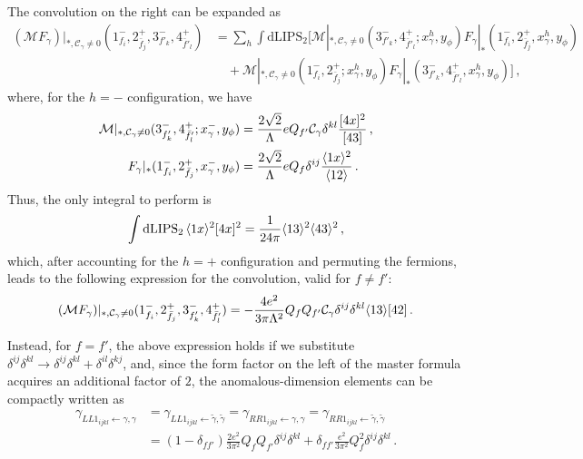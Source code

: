 The convolution on the right can be expanded as
\begin{align}
    (\mathcal M F_\gamma)|_{*,\mathcal C_\gamma \neq 0} (1^-_{f_i},2^+_{\bar f_j}, 3^-_{f'_k},4^+_{\bar f'_l}) &= \sum_h \int \text{dLIPS}_2 \Big[ \mathcal M|_{*,\mathcal C_\gamma \neq 0}(3^-_{f'_k},4^+_{\bar f'_l}; x_{\gamma}^h , y_\phi) F_{\gamma}|_*(1^-_{f_i},2^+_{\bar f_j},x_{\gamma}^h , y_\phi) \nonumber \\
    &\quad +
    \mathcal M|_{*,\mathcal C_\gamma \neq 0}(1^-_{f_i},2^+_{\bar f_j}; x_{\gamma}^h , y_\phi) F_{\gamma}|_*(3^-_{f'_k},4^+_{\bar f'_l},x_{\gamma}^h , y_\phi)
    \Big]\,,
\end{align}
where, for the $h=-$ configuration, we have
\begin{align}
    \mathcal M|_{*,\mathcal C_\gamma \neq 0}(3^-_{f'_k},4^+_{\bar f'_l}; x_{\gamma}^- , y_\phi) &= \frac{2\sqrt{2}}{\Lambda}e Q_{f'}\mathcal C_\gamma\delta^{kl} \frac{\lbrack 4 x \rbrack^2}{\lbrack 4 3 \rbrack}\,,\\
    F_{\gamma}|_*(1^-_{f_i},2^+_{\bar f_j},x_{\gamma}^- , y_\phi) &= \frac{2\sqrt{2}}{\Lambda}e Q_{f}\delta^{ij} \frac{\langle 1 x \rangle^2}{\langle 1 2 \rangle}  \,.
\end{align}
Thus, the only integral to perform is
\begin{equation}
    \int \text{dLIPS}_2 \, \langle 1 x \rangle^2 \lbrack 4 x \rbrack^2 = \frac{1}{24\pi}\langle 1 3 \rangle^2 \langle 4 3 \rangle^2\,,
\end{equation}
which, after accounting for the $h=+$ configuration and permuting the fermions, leads to the
following expression for the convolution, valid for $f \neq f'$:
\begin{align}
    (\mathcal M F_\gamma)|_{*,\mathcal C_\gamma \neq 0} (1^-_{f_i},2^+_{\bar f_j}, 3^-_{f'_k},4^+_{\bar f'_l}) = - \frac{4e^2}{3\pi \Lambda^2}Q_f Q_{f'} \mathcal C_\gamma \delta^{ij} \delta^{kl} \langle 1 3 \rangle\lbrack 4 2 \rbrack\,.
\end{align}

Instead, for $f = f'$, the above expression holds if we substitute
$\delta^{ij} \delta^{kl} \to \delta^{ij} \delta^{kl} + \delta^{il} \delta^{kj}$, and, since the
form factor on the left of the master formula acquires an additional factor of $2$, the
anomalous-dimension elements can be compactly written as
\begin{align}
    \gamma_{LL1_{ijkl} \leftarrow \gamma,\gamma } &=
    \gamma_{LL1_{ijkl} \leftarrow \tilde\gamma, \tilde\gamma} =
    \gamma_{RR1_{ijkl} \leftarrow \gamma,\gamma } =
    \gamma_{RR1_{ijkl} \leftarrow \tilde\gamma, \tilde\gamma}\nonumber \\
    &= (1-\delta_{ff'})\frac{2e^2}{3\pi^2 } Q_f Q_{f'}  \delta^{ij} \delta^{kl} +   \delta_{ff'}\frac{e^2}{3\pi^2 } Q_f^2  \delta^{ij} \delta^{kl}\,.\label{eq:ALPLL1fromgammagamma}
\end{align}

